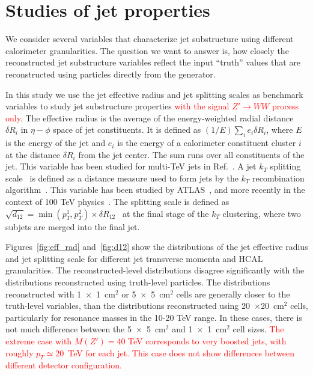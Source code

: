\section{Studies of jet properties}
\label{sec:jets}

We consider several variables that characterize jet substructure using different calorimeter granularities. The question we want to answer is, how closely the reconstructed
jet substructure variables reflect the input ``truth'' values  that are reconstructed using particles directly from the \pythia generator.

In this study we use the jet effective radius and jet splitting scales as benchmark variables
to study jet substructure properties \textcolor{red}{with the signal $Z'\rightarrow WW$ process only}. 
The effective radius is the average of the energy-weighted radial distance $\delta R_i$ in $\eta-\phi$ space of jet constituents.
It is defined as $(1/E) \sum_i e_i \delta R_i$, where $E$ is the energy of the jet and $e_i$ is the energy of a calorimeter 
constituent cluster $i$ at the distance $\delta R_i$ from the jet center. The sum runs over all constituents of the jet. 
This variable has been studied for multi-TeV jets in Ref.~\cite{Auerbach:2014xua}.
A jet $k_T$ splitting scale~\cite{Butterworth:2002tt} is defined as a distance measure
used to form jets by the $k_T$ recombination
algorithm~\cite{Catani1993187,Ellis:1993tq}.
This variable has been studied by ATLAS~\cite{ATLAS:2012am}, and more recently in the context of 100 TeV physics~\cite{Auerbach:2014xua}.
The splitting scale is defined as $\sqrt{d_{12}}=\min(p_T^1,p_T^2) \times \delta R_{12}$~\cite{ATLAS:2012am} 
 at the final stage of the $k_T$ clustering, where two subjets are merged into the final jet.

Figures~\ref{fig:eff_rad} and~\ref{fig:d12} show the distributions of 
the jet effective radius and jet splitting scale for  different jet transverse momenta and HCAL granularities. 
The reconstructed-level distributions  disagree significantly with the distributions  
reconstructed using truth-level particles. The distributions reconstructed with 1~$\times$~1~cm$^2$ or 5~$\times$~5~cm$^2$ cells 
 are generally closer to the truth-level variables, than the distributions 
reconstructed using 20~$\times$20~cm$^2$ cells, particularly for resonance masses in the 10-20 TeV range. In these cases, there is not much  difference between the 
 5~$\times$~5~cm$^2$ and  1~$\times$~1~cm$^2$ cell sizes. \textcolor{red}{The extreme case with $M(Z')=40$ TeV corresponds to very boosted jets, 
with roughly $p_T \simeq 20$~TeV for each jet.  This case does not show 
differences between different detector configuration.}

